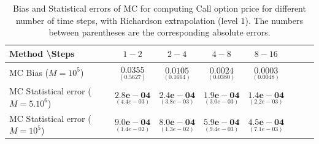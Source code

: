 \documentclass[11pt]{article}
\begin{document}
\begin{table}[h!]
	\centering
	\begin{tabular}{l*{6}{c}r}
		Method \textbackslash  Steps            & $1-2$ & $2-4$ & $4-8$ & $8-16$  \\
		\hline
		MC Bias ($M=10^5$)   & 	$ \underset{(    0.5627
			 )}{\mathbf{0.0355}}$  & $\underset{(  0.1664)}{\mathbf{ 0.0105
		}}$  & $\underset{( 0.0380)}{\mathbf{0.0024}}$ & $\underset{( 0.0048
	 )}{\mathbf{ 0.0003  }}$\\ 
		
		MC Statistical error ($M=5.10^6$)     & 	$ \underset{(  4.4e-03 )}{\mathbf{2.8e-04}}$  & $\underset{(3.8e-03 )}{\mathbf{ 2.4e-04
		}}$  & $\underset{(3.0e-03)}{\mathbf{1.9e-04}}$ & $\underset{(2.2e-03 )}{\mathbf{ 1.4e-04  }}$\\ 
		
			MC Statistical error ($M=10^5$)     & 	$ \underset{(  1.4e-02 )}{\mathbf{9.0e-04}}$  & $\underset{(1.3e-02)}{\mathbf{ 8.0e-04
		}}$  & $\underset{(9.4e-03)}{\mathbf{5.9e-04}}$ & $\underset{( 7.1e-03 )}{\mathbf{ 4.5e-04  }}$\\ 
		\hline
	\end{tabular}
	\caption{Bias and Statistical errors of MC  for computing Call option price  for different number of time steps, with Richardson extrapolation (level $1$). The numbers between parentheses are the corresponding absolute errors.}
	\label{Bias and Statistical errors of MC  for computing Call option price  for different number of time steps, with Richardson extrapolation (level $1$). The numbers between parentheses are the corresponding absolute errors.}
\end{table}
\end{document}
